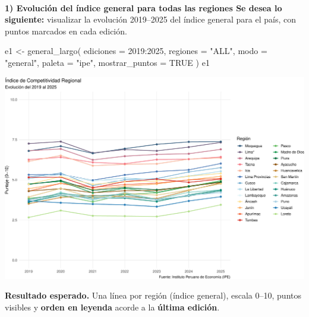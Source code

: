 \documentclass[
  11pt,
  letterpaper,
  DIV=11,
  numbers=noendperiod]{scrartcl}
\makeatletter
\let\oldparagraph\paragraph
\renewcommand{\paragraph}{
    \@ifstar
      \xxxParagraphStar
      \xxxParagraphNoStar
  }
\newcommand{\xxxParagraphStar}[1]{\oldparagraph*{#1}\mbox{}}
\newcommand{\xxxParagraphNoStar}[1]{\oldparagraph{#1}\mbox{}}
\newenvironment{Shaded}{\begin{snugshade}}{\end{snugshade}}
\newcommand{\AttributeTok}[1]{\textcolor[rgb]{0.40,0.45,0.13}{#1}}
\newcommand{\ConstantTok}[1]{\textcolor[rgb]{0.56,0.35,0.01}{#1}}
\newcommand{\DecValTok}[1]{\textcolor[rgb]{0.68,0.00,0.00}{#1}}
\newcommand{\FunctionTok}[1]{\textcolor[rgb]{0.28,0.35,0.67}{#1}}
\newcommand{\NormalTok}[1]{\textcolor[rgb]{0.00,0.23,0.31}{#1}}
\newcommand{\OtherTok}[1]{\textcolor[rgb]{0.00,0.23,0.31}{#1}}
\newcommand{\SpecialCharTok}[1]{\textcolor[rgb]{0.37,0.37,0.37}{#1}}
\newcommand{\StringTok}[1]{\textcolor[rgb]{0.13,0.47,0.30}{#1}}
\makeatother
\begin{document}
\paragraph{\texorpdfstring{\textbf{1) Evolución del índice general para
todas las regiones Se desea lo siguiente:} visualizar la evolución
2019--2025 del índice general para el país, con puntos marcados en cada
edición.}{1) Evolución del índice general para todas las regiones Se desea lo siguiente: visualizar la evolución 2019--2025 del índice general para el país, con puntos marcados en cada edición.}}\label{evoluciuxf3n-del-uxedndice-general-para-todas-las-regiones-se-desea-lo-siguiente-visualizar-la-evoluciuxf3n-20192025-del-uxedndice-general-para-el-pauxeds-con-puntos-marcados-en-cada-ediciuxf3n.}

\begin{Shaded}
\begin{Highlighting}[]
\NormalTok{e1 }\OtherTok{\textless{}{-}} \FunctionTok{general\_largo}\NormalTok{(}
  \AttributeTok{ediciones =} \DecValTok{2019}\SpecialCharTok{:}\DecValTok{2025}\NormalTok{,}
  \AttributeTok{regiones  =} \StringTok{"ALL"}\NormalTok{,}
  \AttributeTok{modo      =} \StringTok{"general"}\NormalTok{,}
  \AttributeTok{paleta    =} \StringTok{"ipe"}\NormalTok{,}
  \AttributeTok{mostrar\_puntos =} \ConstantTok{TRUE}
\NormalTok{)}
\NormalTok{e1}
\end{Highlighting}
\end{Shaded}

\includegraphics{Manual_files/figure-pdf/unnamed-chunk-36-1.pdf}

\textbf{Resultado esperado.} Una línea por región (índice general),
escala 0--10, puntos visibles y \textbf{orden en leyenda} acorde a la
\textbf{última edición}.
\end{document}
